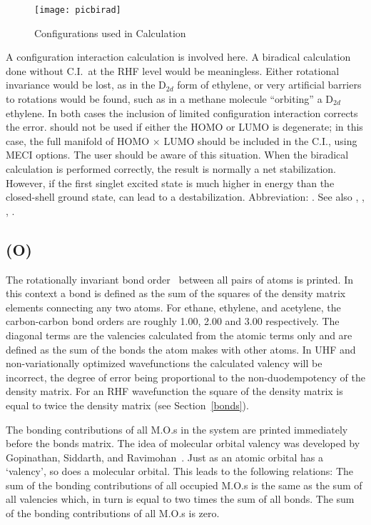 \begin{figure}
\begin{center}
\texttt{[image: picbirad]}
\end{center}
\caption{\label{birad}Configurations used in  Calculation}
\end{figure}

A configuration interaction calculation is involved  here.   A  biradical
calculation  done  without  C.I.\ at  the  RHF level would be meaningless.
 Either rotational invariance would  be  lost,
as  in  the  D$_{2d}$ form  of ethylene,  or  very artificial barriers to
rotations would be found, such as in a methane molecule ``orbiting'' a D$_{2d}$
ethylene.  In  both  cases  the inclusion  of  limited  configuration
interaction  corrects  the  error.  should not be used if
either the HOMO or LUMO is degenerate; in this case, the full manifold of HOMO
$\times$ LUMO should be included in the C.I., using MECI options.  The user
should be aware  of  this  situation. When  the  biradical  calculation  is
performed correctly, the result is normally a net stabilization.  However,  if
the  first  singlet  excited state  is  much  higher  in  energy  than  the
closed-shell ground state,  can lead to a destabilization.
Abbreviation:  .  See also , , ,
.

\subsection*{ (O)}
\label{k_bonds}
The rotationally invariant bond order~\cite{bonds} between all pairs of atoms
is printed.   In this context a bond is defined as the sum of the squares of
the density matrix  elements  connecting  any  two  atoms.   For  ethane,
ethylene, and  acetylene, the carbon-carbon bond orders are roughly 1.00, 2.00
and 3.00  respectively.   The  diagonal  terms  are  the  valencies
 calculated  from  the atomic terms only and are defined as the
sum of the bonds the atom makes with other  atoms.   In  UHF  and
non-variationally optimized  wavefunctions  the  calculated  valency will be
incorrect, the degree of error  being  proportional  to  the
non-duodempotency  of  the density matrix.  For an RHF wavefunction the square
of the density matrix is equal to twice the density matrix (see
Section~\ref{bonds}).

The bonding contributions of all M.O.s in the  system  are  printed
immediately  before  the  bonds  matrix.   The  idea of molecular orbital
valency was developed by Gopinathan, Siddarth, and Ravimohan~\cite{m.o.valency}. Just as an atomic  orbital  has a `valency', so does a molecular orbital.  This leads
to the following relations:  The sum of the bonding contributions of  all
occupied M.O.s is the same as the sum of all valencies which, in turn is
equal to two times the  sum  of  all  bonds.   The  sum  of  the  bonding
contributions of all M.O.s is zero.

